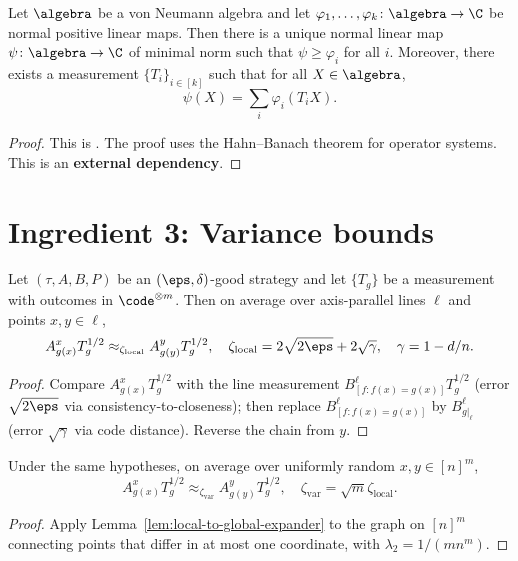 \begin{lemma}\label{lem:duality}
  Let $\algebra$ be a von Neumann algebra and let
  $\varphi_1,\dots,\varphi_k\colon\algebra\to\C$ be normal positive linear
  maps. Then there is a unique normal linear map $\psi\colon\algebra\to\C$ of
  minimal norm such that $\psi\ge\varphi_i$ for all $i$. Moreover, there
  exists a measurement $\{T_i\}_{i\in[k]}$ such that for all $X\in\algebra$,
  \[
    \psi(X)=\sum_i\varphi_i(T_i X).
  \]
\end{lemma}
\begin{proof}
  This is \cite[Proposition~7.1]{de2021orthogonalization}.
  The proof uses the Hahn--Banach theorem for operator systems.
  This is an \textbf{external dependency}.
\end{proof}

\section{Ingredient 3: Variance bounds}

\begin{lemma}\label{lem:local-variance}
  Let $(\tau,A,B,P)$ be an $(\eps,\delta)$-good strategy and let $\{T_g\}$ be a
  measurement with outcomes in $\code^{\otimes m}$. Then on average over
  axis-parallel lines $\ell$ and points $x,y\in\ell$,
  \[
    A^x_{g(x)}T_g^{1/2}\approx_{\zeta_{\mathrm{local}}}
    A^y_{g(y)}T_g^{1/2},
    \quad
    \zeta_{\mathrm{local}}=2\sqrt{2\eps}+2\sqrt{\gamma},
    \quad
    \gamma=1-d/n.
  \]
\end{lemma}
\begin{proof}
  Compare $A^x_{g(x)}T_g^{1/2}$ with the line measurement
  $B^\ell_{[f:f(x)=g(x)]}T_g^{1/2}$ (error $\sqrt{2\eps}$ via
  consistency-to-closeness);
  then replace $B^\ell_{[f:f(x)=g(x)]}$ by $B^\ell_{g|_\ell}$
  (error $\sqrt\gamma$ via code distance).
  Reverse the chain from $y$.
\end{proof}

\begin{lemma}\label{lem:variance}
  Under the same hypotheses, on average over uniformly random
  $x,y\in[n]^m$,
  \[
    A^x_{g(x)}T_g^{1/2}\approx_{\zeta_{\mathrm{var}}}
    A^y_{g(y)}T_g^{1/2},
    \quad
    \zeta_{\mathrm{var}}=\sqrt{m} \zeta_{\mathrm{local}}.
  \]
\end{lemma}
\begin{proof}
  Apply Lemma~\ref{lem:local-to-global-expander} to the graph on $[n]^m$
  connecting points that differ in at most one coordinate, with
  $\lambda_2=1/(mn^m)$.
\end{proof}

